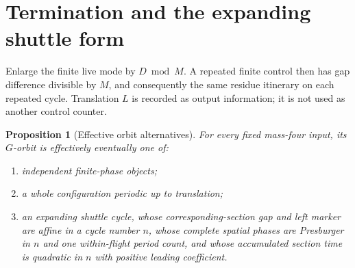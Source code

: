 \documentclass[11pt,letterpaper]{article}
\numberwithin{equation}{section}
\newtheorem{proposition}[theorem]{Proposition}
\theoremstyle{definition}
\theoremstyle{remark}
\begin{document}
\section{Termination and the expanding shuttle form}\label{smc:fm:sec:termination}
Enlarge the finite live mode by $D\bmod M$. A repeated finite control then has
gap difference divisible by $M$, and consequently the same residue itinerary
on each repeated cycle. Translation $L$ is recorded as output information;
it is not used as another control counter.

\begin{proposition}[Effective orbit alternatives]\label{smc:fm:prop:normal}
For every fixed mass-four input, its $G$-orbit is effectively eventually one of:
\begin{enumerate}
\item independent finite-phase objects;
\item a whole configuration periodic up to translation;
\item an expanding shuttle cycle, whose corresponding-section gap and left
marker are affine in a cycle number $n$, whose complete spatial phases are
Presburger in $n$ and one within-flight period count, and whose accumulated
section time is quadratic in $n$ with positive leading coefficient.
\end{enumerate}
\end{proposition}
\end{document}
